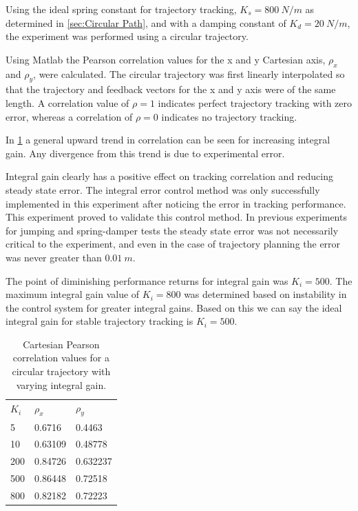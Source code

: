 Using the ideal spring constant for trajectory tracking, $K_s = 800\ N/m$ as determined in \cref{sec:Circular Path}, and with a damping constant of $K_d = 20\ N/m$, the experiment was performed using a circular trajectory.

Using Matlab the Pearson correlation values for the x and y Cartesian axis, $\rho_x$ and $\rho_y$, were calculated. The circular trajectory was first linearly interpolated so that the trajectory and feedback vectors for the x and y axis were of the same length. A correlation value of $\rho = 1$ indicates perfect trajectory tracking with zero error, whereas a correlation of $\rho = 0$ indicates no trajectory tracking.

In \cref{tbl:Cartesian Pearson correlation values for varying integral gain} a general upward trend in correlation can be seen for increasing integral gain. Any divergence from this trend is due to experimental error.

Integral gain clearly has a positive effect on tracking correlation and reducing steady state error. The integral error control method was only successfully implemented in this experiment after noticing the error in tracking performance. This experiment proved to validate this control method. In previous experiments for jumping and spring-damper tests the steady state error was not necessarily critical to the experiment, and even in the case of trajectory planning the error was never greater than $0.01\ m$.

The point of diminishing performance returns for integral gain was $K_i = 500$. The maximum integral gain value of $K_i = 800$ was determined based on instability in the control system for greater integral gains. Based on this we can say the ideal integral gain for stable trajectory tracking is $K_i = 500$. 

\begin{table}[]
\centering
\begin{tabular}{lll}
\textbf{$K_i$} & \textbf{$\rho_x$} & \textbf{$\rho_y$} \\
5             & 0.6716           & 0.4463           \\
10            & 0.63109          & 0.48778          \\
200           & 0.84726          & 0.632237         \\
500           & 0.86448          & 0.72518          \\
800           & 0.82182          & 0.72223         
\end{tabular}
\caption{Cartesian Pearson correlation values for a circular trajectory with varying integral gain.}
\label{tbl:Cartesian Pearson correlation values for varying integral gain}
\end{table}

